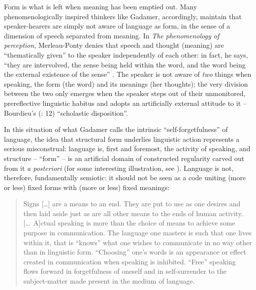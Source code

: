 \documentclass[output=paper]{langscibook}
\begin{document}
\noindent Form is what is left when meaning has been emptied out. Many phenomenologically inspired thinkers like Gadamer, accordingly, maintain that speaker-hearers are simply not aware of language as form, in the sense of a dimension of speech separated from meaning. In \emph{The phenomenology of perception}, Merleau-Ponty denies that speech and thought (meaning) are ``thematically given'' to the speaker independently of each other: in fact, he says, ``they are intervolved, the sense being held within the word, and the word being the external existence of the sense'' \citep[182]{Merleau-Ponty19621945}. The speaker is not aware of \emph{two} things when speaking, the form (the word) and its meanings (her thoughts); the very division between the two only emerges when the speaker steps out of their unmonitored, prereflective linguistic habitus and adopts an artificially external attitude to it -- Bourdieu's (\citeyear{Bourdieu20031997}: 12) ``scholastic disposition''.

In this situation of what Gadamer calls the intrinsic ``self-forgetfulness'' of language, the idea that structural form underlies linguistic action represents a serious misconstrual: language is, first and foremost, the activity of speaking, and structure -- ``form'' -- is an artificial domain of constructed regularity carved out from it \emph{a posteriori} (for some interesting illustration, see \citealt{Preston1996}). Language is not, therefore, fundamentally semiotic: it should not be seen as a code uniting (more or less) fixed forms with (more or less) fixed meanings:

\begin{quotation}
Signs […] are a means to an end. They are put to use as one desires and then laid aside just as are all other means to the ends of human activity. […~A]ctual speaking is more than the choice of means to achieve some purpose in communication.  The language one masters is such that one lives within it, that is ``knows'' what one wishes to communicate in no way other than in linguistic form. ``Choosing'' one's words is an appearance or effect created in communication when speaking is inhibited. ``Free'' speaking flows forward in forgetfulness of oneself and in self-surrender to the subject-matter made present in the medium of language. \citep[87]{Gadamer19761972}
\end{quotation}
\end{document}

